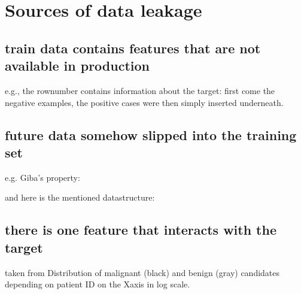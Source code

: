 \documentclass[letterpaper,10pt,english]{jupyterBook}
\begin{document}
\chapter{Sources of data leakage}
\label{\detokenize{dependent_data:sources-of-data-leakage}}

\section{train data contains features that are not available in production}
\label{\detokenize{dependent_data:train-data-contains-features-that-are-not-available-in-production}}
\sphinxAtStartPar
e.g., the row\sphinxhyphen{}number contains information about the target: first come the negative examples, the positive cases were then simply inserted underneath.


\section{future data somehow slipped into the training set}
\label{\detokenize{dependent_data:future-data-somehow-slipped-into-the-training-set}}
\sphinxAtStartPar
e.g. Giba’s property:

\noindent{}

\sphinxAtStartPar
and here is the mentioned data\sphinxhyphen{}structure:

\noindent{}


\section{there is one feature that interacts with the target}
\label{\detokenize{dependent_data:there-is-one-feature-that-interacts-with-the-target}}
\sphinxAtStartPar
taken from 
Distribution of malignant (black) and benign (gray) candidates depending on patient ID on the X\sphinxhyphen{}axis in log scale.

\noindent{}
\end{document}
